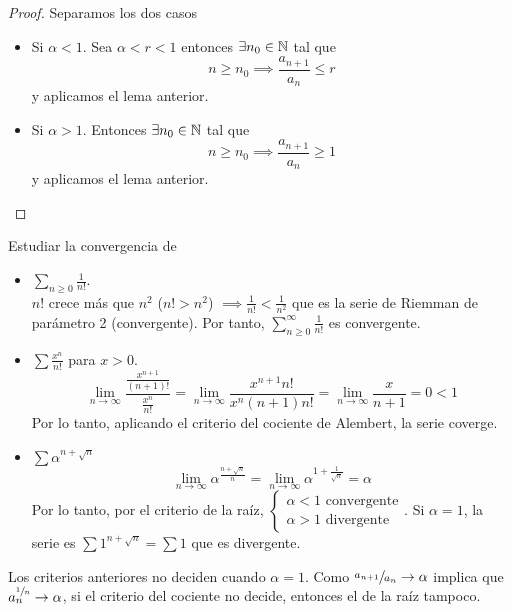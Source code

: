 \begin{proof}
	Separamos los dos casos
	\begin{itemize}
		\item Si $\alpha < 1$. Sea $\alpha < r < 1$ entonces $\exists n_0 \in \mathbb{N}$
		tal que
		\[
			n \geq n_0 \implies \frac{a_{n+1}}{a_n} \leq r
		\]
		y aplicamos el lema anterior.
		\item Si $\alpha > 1$. Entonces  $\exists n_0 \in \mathbb{N}$ tal que
		\[
			n \geq n_0 \implies \frac{a_{n+1}}{a_n} \geq 1
		\]
		y aplicamos el lema anterior.
	\end{itemize}
\end{proof}

\begin{example*}
	Estudiar la convergencia de
	\begin{itemize}
		\item $\sum\limits_{n \geq 0} \frac{1}{n!}$. \\
			$n!$ crece más que	$n^2$ ($n! > n^2$) $\implies \frac{1}{n!} < \frac{1}{n^2}$
			que es la serie de Riemman de parámetro 2 (convergente). Por tanto,
			$\sum\limits_{n \geq 0}^\infty \frac{1}{n!}$ es convergente.
		\item $\sum \frac{x^n}{n!}$ para $x > 0$. \\
			\[
				\lim_{n \to \infty} \frac{\frac{x^{n+1}}{(n+1)!}}{\frac{x^n}{n!}} =
				\lim_{n \to \infty} \frac{x^{n+1}n!}{x^n(n+1)n!} = \lim_{n \to \infty}
				\frac{x}{n+1} = 0 < 1
			\]
			Por lo tanto, aplicando el criterio del cociente de Alembert, la serie coverge.
		\item $\sum \alpha^{n+\sqrt{n}}$ \\
			\[
				\lim_{n \to \infty} \alpha^{\frac{n + \sqrt{n}}{n}} =
				\lim_{n \to \infty} \alpha^{1 + \frac{1}{\sqrt{n}}} = \alpha
			\]
			Por lo tanto, por el criterio de la raíz, $\begin{cases} \alpha < 1
			\text{ convergente} \\ \alpha > 1 \text{ divergente}\end{cases}$. Si $\alpha =1$,
			la serie es $\sum 1^{n + \sqrt{n}} = \sum 1$ que es divergente.
	\end{itemize}
\end{example*}

\begin{obs}
	Los criterios anteriores no deciden cuando $\alpha = 1$. Como $\sfrac{a_{n+1}}{a_n} \to
	\alpha$ implica que $a_n^{\sfrac{1}{n}} \to \alpha$, si el criterio del cociente no
	decide, entonces el de la raíz tampoco.
\end{obs}

